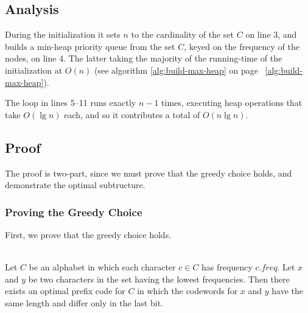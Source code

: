 \subsection{Analysis}
During the initialization it sets $n$ to the cardinality of the set $C$ on
line 3, and builds a min-heap priority queue from the set $C$, keyed on the
frequency of the nodes, on line 4. The latter taking the majority of the
running-time of the initialization at $O(n)$ (see algorithm
\ref{alg:build-max-heap} on page ~\ref{alg:build-max-heap}).

The loop in lines 5--11 runs exactly $n-1$ times, executing heap operations
that take $O(\lg n)$ each, and so it contributes a total of $O(n \lg n)$.

\newpage
\subsection{Proof}
The proof is two-part, since we must prove that the greedy choice holds, and
demonstrate the optimal subtructure.

\subsubsection{Proving the Greedy Choice}
First, we prove that the greedy choice holds.

\begin{lemma} \cite[16.2, p. 433]{clrs} \\
\label{lemma:16.2}
\textnormal
{
	Let $C$ be an alphabet in which each character $c \in C$ has frequency
	$c.freq$. Let $x$ and $y$ be two characters in the set having the lowest
	frequencies. Then there exists an optimal prefix code for $C$ in which the
	codewords for $x$ and $y$ have the same length and differ only in the last
	bit.
}
\end{lemma}

